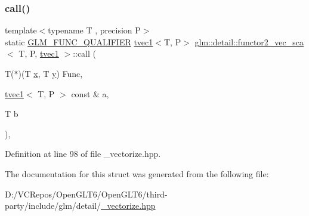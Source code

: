 \subsubsection{\texorpdfstring{call()}{call()}}
{\footnotesize\ttfamily template$<$typename T , precision P$>$ \\
static \mbox{\hyperlink{setup_8hpp_a33fdea6f91c5f834105f7415e2a64407}{G\+L\+M\+\_\+\+F\+U\+N\+C\+\_\+\+Q\+U\+A\+L\+I\+F\+I\+ER}} \mbox{\hyperlink{structglm_1_1tvec1}{tvec1}}$<$T, P$>$ \mbox{\hyperlink{structglm_1_1detail_1_1functor2__vec__sca}{glm\+::detail\+::functor2\+\_\+vec\+\_\+sca}}$<$ T, P, \mbox{\hyperlink{structglm_1_1tvec1}{tvec1}} $>$\+::call (\begin{DoxyParamCaption}\item[{T($\ast$)(T \mbox{\hyperlink{glad_8h_a92d0386e5c19fb81ea88c9f99644ab1d}{x}}, T \mbox{\hyperlink{glad_8h_a66ddd433d2cacfe27f5906b7e86faeed}{y}})}]{Func,  }\item[{\mbox{\hyperlink{structglm_1_1tvec1}{tvec1}}$<$ T, P $>$ const \&}]{a,  }\item[{T}]{b }\end{DoxyParamCaption})\hspace{0.3cm}{\ttfamily [inline]}, {\ttfamily [static]}}



Definition at line 98 of file \+\_\+vectorize.\+hpp.



The documentation for this struct was generated from the following file\+:\begin{DoxyCompactItemize}
\item 
D\+:/\+V\+C\+Repos/\+Open\+G\+L\+T6/\+Open\+G\+L\+T6/third-\/party/include/glm/detail/\mbox{\hyperlink{__vectorize_8hpp}{\+\_\+vectorize.\+hpp}}\end{DoxyCompactItemize}
